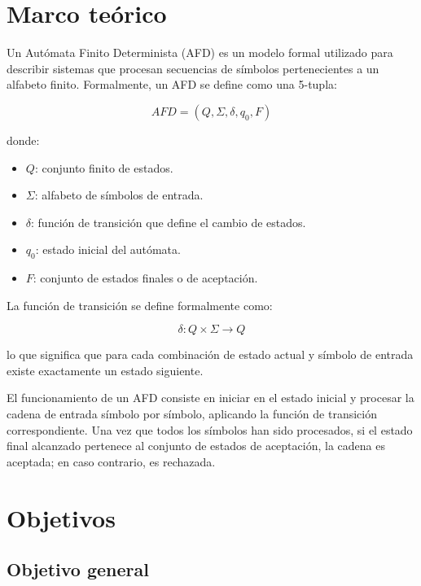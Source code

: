 \documentclass[12pt]{article}
\begin{document}
\newpage


\section{Marco teórico}

Un Autómata Finito Determinista (AFD) es un modelo formal utilizado para describir sistemas que procesan secuencias de símbolos pertenecientes a un alfabeto finito. Formalmente, un AFD se define como una 5-tupla:

\[
AFD = (Q, \Sigma, \delta, q_0, F)
\]

donde:

\begin{itemize}
\item $Q$: conjunto finito de estados.
\item $\Sigma$: alfabeto de símbolos de entrada.
\item $\delta$: función de transición que define el cambio de estados.
\item $q_0$: estado inicial del autómata.
\item $F$: conjunto de estados finales o de aceptación.
\end{itemize}

La función de transición se define formalmente como:

\[
\delta : Q \times \Sigma \rightarrow Q
\]

lo que significa que para cada combinación de estado actual y símbolo de entrada existe exactamente un estado siguiente.

El funcionamiento de un AFD consiste en iniciar en el estado inicial y procesar la cadena de entrada símbolo por símbolo, aplicando la función de transición correspondiente. Una vez que todos los símbolos han sido procesados, si el estado final alcanzado pertenece al conjunto de estados de aceptación, la cadena es aceptada; en caso contrario, es rechazada.

\section{Objetivos}

\subsection{Objetivo general}
\end{document}
